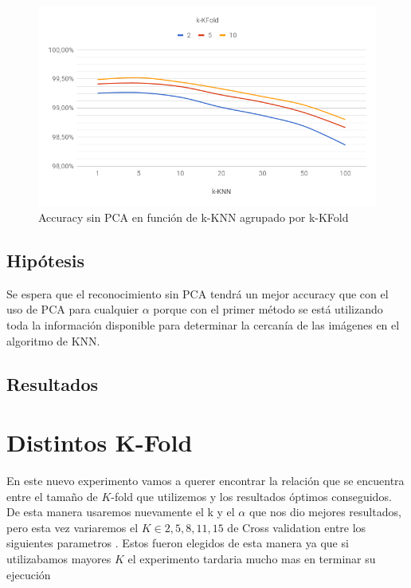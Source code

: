 \begin{figure}[H]
	\centering
	\includegraphics[width=\textwidth]{graficos/cv1_sin_pca_accuracy.png}
	\caption{Accuracy sin PCA en función de k-KNN agrupado por k-KFold}
	\label{fig:cv1_sin_pca_accuracy}
\end{figure}

\subsection{Hipótesis}

Se espera que el reconocimiento sin PCA tendrá un mejor accuracy que con el uso de PCA para cualquier $\alpha$ porque con el primer método se está utilizando toda la información disponible para determinar la cercanía de las imágenes en el algoritmo de KNN.

\subsection{Resultados}



\section{Distintos K-Fold}

En este nuevo experimento vamos a querer encontrar la relación que se encuentra entre el tamaño de $K$-fold que utilizemos y los resultados óptimos conseguidos. De esta manera usaremos nuevamente el k y el $\alpha$ que nos dio mejores resultados, pero esta vez variaremos el $K \in {2,5,8,11,15}$ de Cross validation entre los siguientes parametros . Estos fueron elegidos de esta manera ya que si utilizabamos mayores $K$ el experimento tardaria mucho mas en terminar su ejecución


